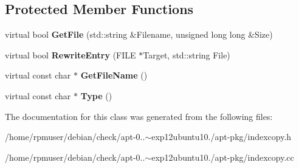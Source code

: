 \subsection*{\-Protected \-Member \-Functions}
\begin{DoxyCompactItemize}
\item 
virtual bool {\bfseries \-Get\-File} (std\-::string \&\-Filename, unsigned long long \&\-Size)\label{classPackageCopy_a6e537ba3dcb7ca8854dee7e9bead5c5e}

\item 
virtual bool {\bfseries \-Rewrite\-Entry} (\-F\-I\-L\-E $\ast$\-Target, std\-::string \-File)\label{classPackageCopy_a56581cf4bf4b32530c6fdeacb6051a65}

\item 
virtual const char $\ast$ {\bfseries \-Get\-File\-Name} ()\label{classPackageCopy_a30310e33e458ab5a340cca45aa4211cd}

\item 
virtual const char $\ast$ {\bfseries \-Type} ()\label{classPackageCopy_a6472491bac6385804dd5e43a29ef7714}

\end{DoxyCompactItemize}


\-The documentation for this class was generated from the following files\-:\begin{DoxyCompactItemize}
\item 
/home/rpmuser/debian/check/apt-\/0..$\sim$exp12ubuntu10./apt-\/pkg/indexcopy.\-h\item 
/home/rpmuser/debian/check/apt-\/0..$\sim$exp12ubuntu10./apt-\/pkg/indexcopy.\-cc\end{DoxyCompactItemize}
